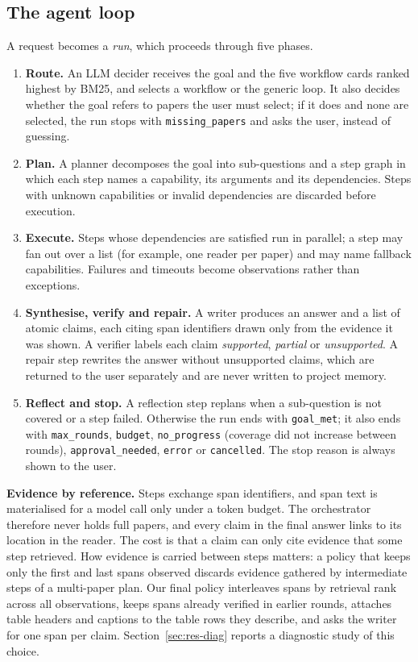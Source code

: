 \documentclass{article}
\newcommand{\code}[1]{\texttt{\small #1}}
\begin{document}
\subsection{The agent loop}
A request becomes a \emph{run}, which proceeds through five phases.
\begin{enumerate}
  \item \textbf{Route.} An LLM decider receives the goal and the five workflow cards ranked highest by BM25, and selects a workflow or the generic loop. It also decides whether the goal refers to papers the user must select; if it does and none are selected, the run stops with \code{missing\_papers} and asks the user, instead of guessing.
  \item \textbf{Plan.} A planner decomposes the goal into sub-questions and a step graph in which each step names a capability, its arguments and its dependencies. Steps with unknown capabilities or invalid dependencies are discarded before execution.
  \item \textbf{Execute.} Steps whose dependencies are satisfied run in parallel; a step may fan out over a list (for example, one reader per paper) and may name fallback capabilities. Failures and timeouts become observations rather than exceptions.
  \item \textbf{Synthesise, verify and repair.} A writer produces an answer and a list of atomic claims, each citing span identifiers drawn only from the evidence it was shown. A verifier labels each claim \emph{supported}, \emph{partial} or \emph{unsupported}. A repair step rewrites the answer without unsupported claims, which are returned to the user separately and are never written to project memory.
  \item \textbf{Reflect and stop.} A reflection step replans when a sub-question is not covered or a step failed. Otherwise the run ends with \code{goal\_met}; it also ends with \code{max\_rounds}, \code{budget}, \code{no\_progress} (coverage did not increase between rounds), \code{approval\_needed}, \code{error} or \code{cancelled}. The stop reason is always shown to the user.
\end{enumerate}

\textbf{Evidence by reference.} Steps exchange span identifiers, and span text is materialised for a model call only under a token budget. The orchestrator therefore never holds full papers, and every claim in the final answer links to its location in the reader. The cost is that a claim can only cite evidence that some step retrieved. How evidence is carried between steps matters: a policy that keeps only the first and last spans observed discards evidence gathered by intermediate steps of a multi-paper plan. Our final policy interleaves spans by retrieval rank across all observations, keeps spans already verified in earlier rounds, attaches table headers and captions to the table rows they describe, and asks the writer for one span per claim. Section~\ref{sec:res-diag} reports a diagnostic study of this choice.
\end{document}
